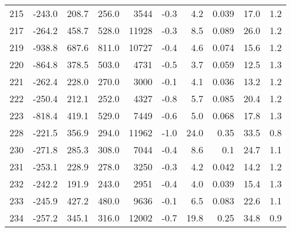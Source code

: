 \begin{table}[ht]
\begin{tabular}{rrrrrrrrrr}
215 &  -243.0 &  208.7 &  256.0 &     3544 &    -0.3 &         4.2 & 0.039 &       17.0 &        1.2 \\
217 &  -264.2 &  458.7 &  528.0 &    11928 &    -0.3 &         8.5 & 0.089 &       26.0 &        1.2 \\
219 &  -938.8 &  687.6 &  811.0 &    10727 &    -0.4 &         4.6 & 0.074 &       15.6 &        1.2 \\
220 &  -864.8 &  378.5 &  503.0 &     4731 &    -0.5 &         3.7 & 0.059 &       12.5 &        1.3 \\
221 &  -262.4 &  228.0 &  270.0 &     3000 &    -0.1 &         4.1 & 0.036 &       13.2 &        1.2 \\
222 &  -250.4 &  212.1 &  252.0 &     4327 &    -0.8 &         5.7 & 0.085 &       20.4 &        1.2 \\
223 &  -818.4 &  419.1 &  529.0 &     7449 &    -0.6 &         5.0 & 0.068 &       17.8 &        1.3 \\
228 &  -221.5 &  356.9 &  294.0 &    11962 &    -1.0 &        24.0 &  0.35 &       33.5 &        0.8 \\
230 &  -271.8 &  285.3 &  308.0 &     7044 &    -0.4 &         8.6 &   0.1 &       24.7 &        1.1 \\
231 &  -253.1 &  228.9 &  278.0 &     3250 &    -0.3 &         4.2 & 0.042 &       14.2 &        1.2 \\
232 &  -242.2 &  191.9 &  243.0 &     2951 &    -0.4 &         4.0 & 0.039 &       15.4 &        1.3 \\
233 &  -245.9 &  427.2 &  480.0 &     9636 &    -0.1 &         6.5 & 0.083 &       22.6 &        1.1 \\
234 &  -257.2 &  345.1 &  316.0 &    12002 &    -0.7 &        19.8 &  0.25 &       34.8 &        0.9 \\
\bottomrule
\end{tabular}
\label{tbl:cs:codec:measure:stats}
\end{table}
